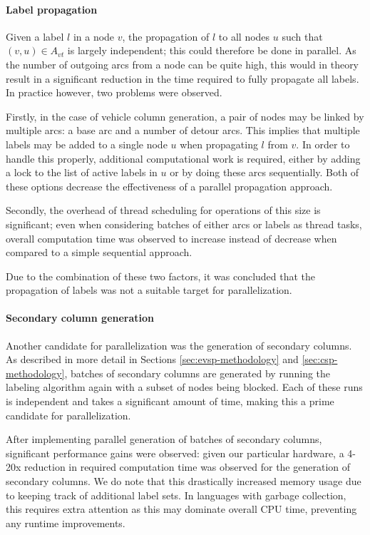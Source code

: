 \documentclass[]{article}
\begin{document}
\paragraph{Label propagation}
Given a label $l$ in a node $v$, the propagation of $l$ to all nodes $u$ such that $(v, u) \in A_{vt}$ is largely independent; this could therefore be done in parallel. As the number of outgoing arcs from a node can be quite high, this would in theory result in a significant reduction in the time required to fully propagate all labels. In practice however, two problems were observed.

Firstly, in the case of vehicle column generation, a pair of nodes may be linked by multiple arcs: a base arc and a number of detour arcs. This implies that multiple labels may be added to a single node $u$ when propagating $l$ from $v$. In order to handle this properly, additional computational work is required, either by adding a lock to the list of active labels in $u$ or by doing these arcs sequentially. Both of these options decrease the effectiveness of a parallel propagation approach. 

Secondly, the overhead of thread scheduling for operations of this size is significant; even when considering batches of either arcs or labels as thread tasks, overall computation time was observed to increase instead of decrease when compared to a simple sequential approach. 

Due to the combination of these two factors, it was concluded that the propagation of labels was not a suitable target for parallelization.

\paragraph{Secondary column generation}
Another candidate for parallelization was the generation of secondary columns. As described in more detail in Sections \ref{sec:evsp-methodology} and \ref{sec:csp-methodology}, batches of secondary columns are generated by running the labeling algorithm again with a subset of nodes being blocked. Each of these runs is independent and takes a significant amount of time, making this a prime candidate for parallelization.

After implementing parallel generation of batches of secondary columns, significant performance gains were observed: given our particular hardware, a 4-20x reduction in required computation time was observed for the generation of secondary columns. We do note that this drastically increased memory usage due to keeping track of additional label sets. In languages with garbage collection, this requires extra attention as this may dominate overall CPU time, preventing any runtime improvements.
\end{document}

